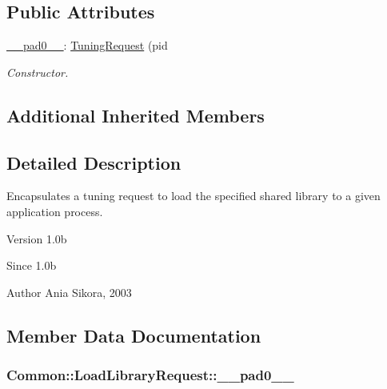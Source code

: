 \subsection*{Public Attributes}
\begin{DoxyCompactItemize}
\item 
\hyperlink{class_common_1_1_load_library_request_a978d8b62146b28487b00bd0394aa3c12}{\-\_\-\-\_\-pad0\-\_\-\-\_\-}\-: \hyperlink{class_common_1_1_tuning_request}{Tuning\-Request} (pid
\begin{DoxyCompactList}\small\item\em Constructor. \end{DoxyCompactList}\end{DoxyCompactItemize}
\subsection*{Additional Inherited Members}


\subsection{Detailed Description}
Encapsulates a tuning request to load the specified shared library to a given application process. 

\begin{DoxyVersion}{Version}
1.\-0b 
\end{DoxyVersion}
\begin{DoxySince}{Since}
1.\-0b 
\end{DoxySince}
\begin{DoxyAuthor}{Author}
Ania Sikora, 2003 
\end{DoxyAuthor}


\subsection{Member Data Documentation}
\hypertarget{class_common_1_1_load_library_request_a978d8b62146b28487b00bd0394aa3c12}{
\subsubsection[{\-\_\-\-\_\-pad0\-\_\-\-\_\-}]{\setlength{\rightskip}{0pt plus 5cm}Common\-::\-Load\-Library\-Request\-::\-\_\-\-\_\-pad0\-\_\-\-\_\-}}\label{class_common_1_1_load_library_request_a978d8b62146b28487b00bd0394aa3c12}


